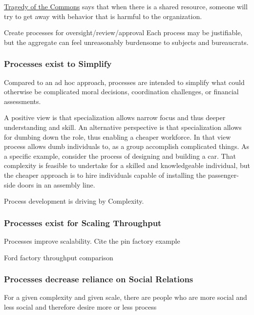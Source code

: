 \href{https://en.wikipedia.org/wiki/Tragedy_of_the_commons}{Tragedy of the Commons} says that when there is a shared resource, someone will try to get away with behavior that is harmful to the organization.

Create processes for oversight/review/approval
Each process may be justifiable, but the aggregate can feel unreasonably burdensome to subjects and bureaucrats.






\subsubsection{Processes exist to Simplify}
Compared to an ad hoc approach, processes are intended to simplify what could otherwise be complicated moral decisions, coordination challenges, or financial assessments. %



A positive view is that specialization allows narrow focus and thus deeper understanding and skill. An alternative perspective is that specialization allows for dumbing down the role, thus enabling a cheaper workforce. In that view process allows dumb individuals to, as a group accomplish complicated things.  As a specific example, consider the process of designing and building a car. That complexity is feasible to undertake for a skilled and knowledgeable individual, but the cheaper approach is to hire individuals capable of installing the passenger-side doors in an assembly line.

Process development is driving by Complexity.

\subsubsection{Processes exist for Scaling Throughput}

Processes improve scalability. Cite the pin factory example

Ford factory throughput comparison

\subsubsection{Processes decrease reliance on Social Relations}

For a given complexity and given scale, there are people who are more social and less social and therefore desire more or less process


